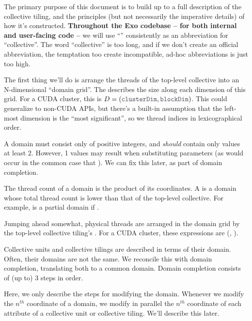 \filbreak
The primary purpose of this document is to build up to a full description of the collective tiling, and the principles (but not necessarily the imperative details) of how it's constructed.
\textbf{Throughout the Exo codebase -- for both internal and user-facing code -- } we will use ``'' consistently as an abbreviation for ``collective''.
The word ``collective'' is too long, and if we don't create an official abbreviation, the temptation too create incompatible, ad-hoc abbreviations is just too high.

\filbreak
{}

The first thing we'll do is arrange the threads of the top-level collective into an N-dimensional ``domain grid''.
The  describes the size along each dimension of this grid.
For a CUDA cluster, this is $D = (\lighttt{clusterDim}, \lighttt{blockDim})$.
This could generalize to non-CUDA APIs, but there's a built-in assumption that the left-most dimension is the ``most significant'', so we  thread indices in lexicographical order.

A domain must consist only of positive integers, and \textit{should} contain only values at least 2.
However, 1 values may result when substituting parameters (as would occur in the common case that ).
We can fix this later, as part of domain completion.

\filbreak
The thread count of a domain is the product of its coordinates.
A  is a domain whose total thread count is lower than that of the top-level collective.
For example,  is a partial domain if .

\filbreak
Jumping ahead somewhat, physical threads are arranged in the domain grid by the top-level collective tiling's .
For a CUDA cluster, these expressions are (, ).

\filbreak
{}

Collective units and collective tilings are described in terms of their domain.
Often, their domains are not the same.
We reconcile this with domain completion, translating both to a common domain.
Domain completion consists of (up to) 3 steps in order.

\filbreak
Here, we only describe the steps for modifying the domain.
Whenever we modify the $n^{th}$ coordinate of a domain, we modify in parallel the $n^{th}$ coordinate of each attribute of a collective unit or collective tiling.
We'll describe this later.

